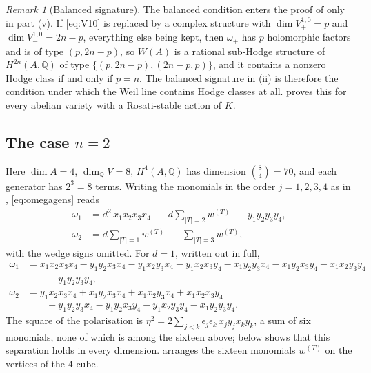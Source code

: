 \documentclass[11pt,reqno]{amsart}
\theoremstyle{plain}
\theoremstyle{definition}
\theoremstyle{remark}
\newtheorem{remark}[theorem]{Remark}
\newcommand{\QQ}{\mathbb{Q}}
\newcommand{\HW}{W}                      %
\begin{document}
\begin{remark}[Balanced signature]\label{rem:balancecount}
The balanced condition enters the proof of  only in
part (v). If \eqref{eq:V10} is replaced by a complex structure with
$\dim V^{1,0}_{+}=p$ and $\dim V^{1,0}_{-}=2n-p$, everything else being kept,
then $\omega_{+}$ has $p$ holomorphic factors and is of type $(p,2n-p)$, so
$\HW(A)$ is a rational sub-Hodge structure of $H^{2n}(A,\QQ)$ of type
$\{(p,2n-p),(2n-p,p)\}$, and it contains a nonzero Hodge class if and only if
$p=n$. The balanced signature
in (ii) is therefore the condition under which the Weil
line contains Hodge classes at all.  proves this
for every abelian variety with a Rosati-stable action of $K$.
\end{remark}

\subsection{The case \texorpdfstring{$n=2$}{n=2}}

Here $\dim A=4$, $\dim_{\QQ}V=8$, $H^{4}(A,\QQ)$ has dimension
$\binom{8}{4}=70$, and each generator has $2^{3}=8$ terms. Writing the
monomials in the order $j=1,2,3,4$ as in , \eqref{eq:omegagens}
reads
\begin{align}
  \omega_{1}
  &= d^{2}\,x_{1}x_{2}x_{3}x_{4}
     \;-\;d\!\!\sum_{|T|=2}\!\!w^{(T)}
     \;+\;y_{1}y_{2}y_{3}y_{4},
     \label{eq:n2omega1}\\[2pt]
  \omega_{2}
  &= d\!\!\sum_{|T|=1}\!\!w^{(T)}
     \;-\;\sum_{|T|=3}\!\!w^{(T)} ,
     \label{eq:n2omega2}
\end{align}
with the wedge signs omitted. For $d=1$, written out in full,
\begin{align*}
  \omega_{1}
  &= x_{1}x_{2}x_{3}x_{4}
   -y_{1}y_{2}x_{3}x_{4}-y_{1}x_{2}y_{3}x_{4}-y_{1}x_{2}x_{3}y_{4}
   -x_{1}y_{2}y_{3}x_{4}-x_{1}y_{2}x_{3}y_{4}-x_{1}x_{2}y_{3}y_{4}\\
  &\qquad{}+y_{1}y_{2}y_{3}y_{4},\\
  \omega_{2}
  &= y_{1}x_{2}x_{3}x_{4}+x_{1}y_{2}x_{3}x_{4}+x_{1}x_{2}y_{3}x_{4}
     +x_{1}x_{2}x_{3}y_{4}\\
  &\qquad{}-y_{1}y_{2}y_{3}x_{4}-y_{1}y_{2}x_{3}y_{4}-y_{1}x_{2}y_{3}y_{4}
     -x_{1}y_{2}y_{3}y_{4} .
\end{align*}
The square of the polarisation is
$\eta^{2}=2\sum_{j<k}\epsilon_{j}\epsilon_{k}\,x_{j}y_{j}x_{k}y_{k}$,
a sum of six monomials, none of which is among the sixteen above;
 below shows that this separation holds in every
dimension.  arranges the sixteen monomials $w^{(T)}$ on
the vertices of the $4$-cube.
\end{document}
